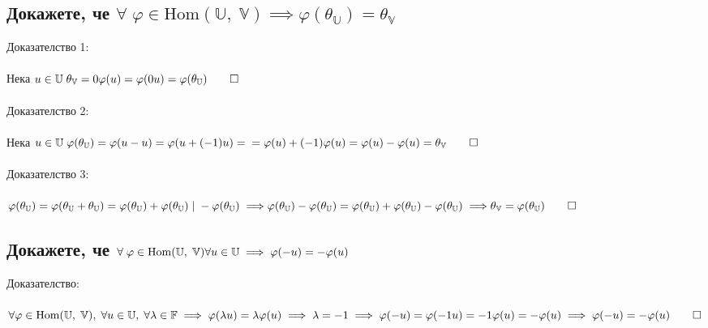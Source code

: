 \documentclass{article}
\newcommand{\V}{\mathbb{V}}
\newcommand{\F}{\mathbb{F}}
\newcommand{\UV}{\mathbb{U}}
\newcommand{\OV}{\theta}
\begin{document}
    \subsection{Докажете, че \(\forall \; \varphi \in \mathrm{Hom}(\UV, \; \V) \implies \varphi(\OV_\UV) = \OV_\V\)}
    Доказателство 1: \\\\
    Нека \(u \in \UV \; \OV_\V = 0\varphi(u) = \varphi(0u) = \varphi(\OV_\UV) \qed \) \\\\
    Доказателство 2: \\\\
    Нека \(u \in \UV \; \varphi(\OV_\UV) = \varphi(u - u) = \varphi(u + (-1)u) = \\\\
    = \varphi(u) + (-1)\varphi(u) = \varphi(u) - \varphi(u) = \OV_\V \qed \) \\\\
    Доказателство 3: \\\\
    \(\varphi(\OV_\UV) = \varphi(\OV_\UV + \OV_\UV) = \varphi(\OV_\UV) + \varphi(\OV_\UV) \; | \; -\varphi(\OV_\UV) \implies \\\\
    \varphi(\OV_\UV) - \varphi(\OV_\UV) = \varphi(\OV_\UV) + \varphi(\OV_\UV) - \varphi(\OV_\UV) \implies \\\\
    \OV_\V = \varphi(\OV_\UV) \qed \)
    \subsection{Докажете, че \(\forall \; \varphi \in \mathrm{Hom}(\UV, \; \V) \\
    \forall u \in \UV \implies \varphi(-u) = -\varphi(u)\)}
    Доказателство: \\\\
    \(\forall \varphi \in \mathrm{Hom}(\UV, \; \V), \; \forall u \in \UV, \; \forall \lambda \in \F \implies \varphi(\lambda u) = \lambda \varphi(u) \\\\
    \implies \lambda = -1 \implies \varphi(-u) = \varphi(-1u) = -1\varphi(u) = -\varphi(u) \\\\
    \implies \varphi(-u) = -\varphi(u) \qed\)
\end{document}

